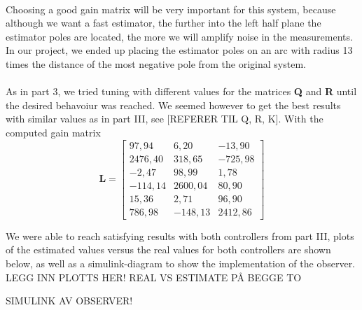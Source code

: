 \\Choosing a good gain matrix will be very important for this system, because although we want a fast estimator, the further into the left half plane the estimator poles are located, the more we will amplify noise in the measurements. In our project, we ended up placing the estimator poles on an arc with radius 13 times the distance of the most negative pole from the original system.\\
\\As in part 3, we tried tuning with different values for the matrices \textbf{Q} and \textbf{R} until the desired behavoiur was reached. We seemed however to get the best results with similar values as in part III, see [REFERER TIL Q, R, K]. With the computed gain matrix
\begin{equation}\nonumber
\mathbf{L} = \begin{bmatrix}
97,94 & 6,20 & -13,90\\
2476,40 & 318,65 & -725,98\\
-2,47 & 98,99 &	1,78\\
-114,14 & 2600,04 &	80,90\\
15,36 & 2,71 & 96,90\\
786,98 & -148,13 & 2412,86
\end{bmatrix}
\end{equation}

We were able to reach satisfying results with both controllers from part III, plots of the estimated values versus the real values for both controllers are shown below, as well as a simulink-diagram to show the implementation of the observer.
LEGG INN PLOTTS HER! REAL VS ESTIMATE PÅ BEGGE TO

SIMULINK AV OBSERVER!


